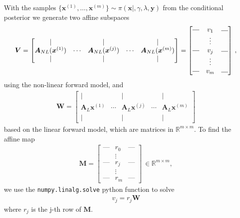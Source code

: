 With the samples $\{\bm{x}^{(1)} ,\dots, \bm{x}^{(m)}\}\sim \pi(\bm{x}|, \gamma, \lambda, \bm{y}) $ from the conditional posterior we generate two affine subspaces
\begin{align}
	\bm{V} = \begin{bmatrix}
		\vert&   &  \vert & & \vert \\
		\bm{A}_{NL} (\bm{x}^{(1)} ) &  \cdots& \bm{A}_{NL} (\bm{x}^{(j)} )&  \cdots & \bm{A}_{NL} (\bm{x}^{(m)})  \\
		\vert&   &  \vert & & \vert 
	\end{bmatrix} = 
	\begin{bmatrix}
		\rule[.5ex]{1em}{0.4pt} & v_1 &	\rule[.25ex]{1em}{0.4pt}\\
		&\vdots  & \\
		\rule[.5ex]{1em}{0.4pt} &v_j &	\rule[.25ex]{1em}{0.4pt}\\
		&\vdots  & \\
		\rule[.5ex]{1em}{0.4pt}& v_m&	\rule[.25ex]{1em}{0.4pt}
	\end{bmatrix} \, ,
\end{align} 
using the non-linear forward model, and 
\begin{align}
	\bm{W} = \begin{bmatrix}
		\vert&   &  \vert & & \vert \\
		\bm{A}_{L} \bm{x}^{(1)} &  \cdots& \bm{A}_{L} \bm{x}^{(j)} &  \cdots & \bm{A}_{L} \bm{x}^{(m)} \\
		\vert&   &  \vert & & \vert 
	\end{bmatrix}
\end{align}
based on the linear forward model, which are matrices in $\mathbb{R}^{m \times m}$.
To find the affine map \begin{align}
	\bm{M} = \begin{bmatrix}
		\text{---} & r_0 &   \text{---}  \\
		&  \vdots  & \\
		\text{---}& r_j &  \text{---} \\
		&  \vdots  & \\
		\text{---} & r_m &   \text{---}
	\end{bmatrix} \, \in \mathbb{R}^{m \times m} ,
\end{align} we use the \texttt{numpy.linalg.solve} python function to solve
\begin{align}
	v_j = r_j \bm{W}
\end{align}
where $r_j$ is the j-th row of $\bm{M}$.


